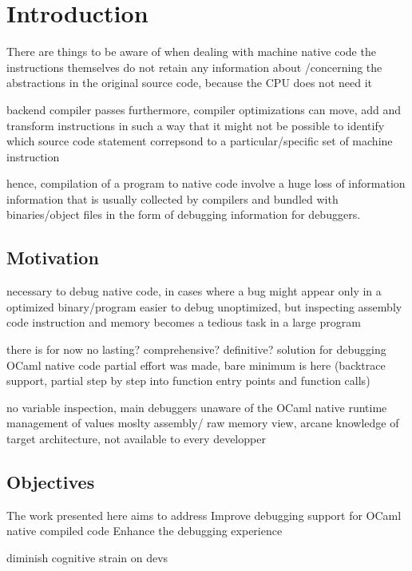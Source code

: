 \chapter{Introduction\label{cha:chapter1}}

There are things to be aware of when dealing with machine native code
the instructions themselves do not retain any information about /concerning the abstractions in the
original source code, because the CPU does not need it

backend compiler passes
furthermore, compiler optimizations can move, add and transform instructions in such a way that it might not be possible
to identify which source code statement correpsond to a particular/specific set of machine instruction

hence, compilation of a program to native code involve a huge loss of information
information that is usually collected by compilers and bundled with binaries/object files in the form of
debugging information for debuggers.

\section{Motivation\label{sec:moti}}

necessary to debug native code, in cases where a bug might appear only in a optimized binary/program
easier to debug unoptimized, but inspecting assembly code instruction and memory becomes a tedious task in a large program

there is for now no lasting? comprehensive? definitive? solution for debugging OCaml native code
partial effort was made, bare minimum is here (backtrace support, partial step by step into function entry points and function calls)

no variable inspection, main debuggers unaware of the OCaml native runtime management of values
moslty assembly/ raw memory view, arcane knowledge of target architecture, not available to every developper

\section{Objectives\label{sec:objective}}
The work presented here aims to address
Improve debugging support for OCaml native compiled code
Enhance the debugging experience

diminish cognitive strain on devs


